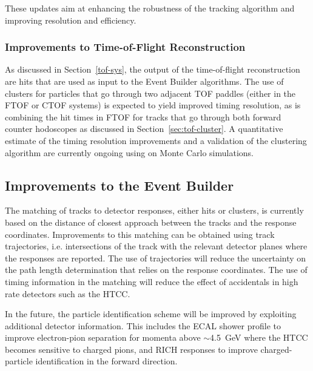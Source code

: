 These updates aim at enhancing the robustness of the tracking algorithm and improving resolution and efficiency.

\subsubsection{Improvements to Time-of-Flight Reconstruction}

As discussed in Section~\ref{tof-sys}, the output of the time-of-flight reconstruction are hits that are used
as input to the Event Builder algorithms. The use of clusters for particles that go through two adjacent TOF
paddles (either in the FTOF or CTOF systems) is expected to yield improved timing resolution, as is combining
the hit times in FTOF for tracks that go through both forward counter hodoscopes as discussed in
Section~\ref{sec:tof-cluster}. A quantitative estimate of the timing resolution improvements and a validation of
the clustering algorithm are currently ongoing using on Monte Carlo simulations.

\subsection{Improvements to the Event Builder}

The matching of tracks to detector responses, either hits or clusters, is currently based on the distance of closest
approach between the tracks and the response coordinates. Improvements to this matching can be obtained using
track trajectories, i.e. intersections of the track with the relevant detector planes where the responses are reported.
The use of trajectories will reduce the uncertainty on the path length determination that relies on the response
coordinates. The use of timing information in the matching will reduce the effect of accidentals in high rate detectors
such as the HTCC.

In the future, the particle identification scheme will be improved by exploiting additional detector information. This
includes the ECAL shower profile to improve electron-pion separation for momenta above $\sim$4.5~GeV where the
HTCC becomes sensitive to charged pions, and RICH responses to improve charged-particle identification in the
forward direction.

